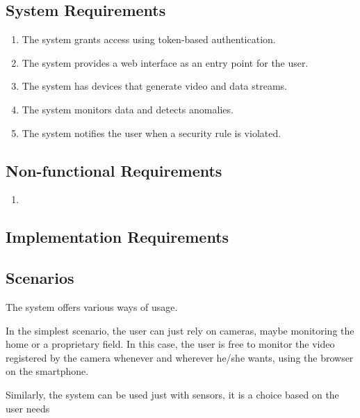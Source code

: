 \documentclass{scrartcl}
\begin{document}
    \subsection{System Requirements}\label{subsec:system-requirements}
    \begin{enumerate}
        \item \label{itm:sys-1} The system grants access using token-based authentication.
        \item \label{itm:sys-2} The system provides a web interface as an entry point for the user.
        \item \label{itm:sys-3} The system has devices that generate video and data streams.
        \item \label{itm:sys-4} The system monitors data and detects anomalies.
        \item \label{itm:sys-5} The system notifies the user when a security rule is violated.
    \end{enumerate}

    \subsection{Non-functional Requirements}\label{subsec:non-functional-requirements}
    \begin{enumerate}
        \item \label{itm:func-1}
    \end{enumerate}

    \subsection{Implementation Requirements}

    \begin{enumerate}
    \end{enumerate}


    \subsection{Scenarios}
    The system offers various ways of usage.

    In the simplest scenario, the user can just rely on cameras, maybe monitoring
    the home or a proprietary field.
    In this case, the user is free to monitor the video registered by the camera whenever and wherever he/she wants,
    using the browser on the smartphone.

    Similarly, the system can be used just with sensors, it is a choice based on the user needs
\end{document}
